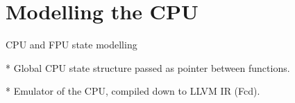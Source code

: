 
\section{Modelling the CPU}

CPU and FPU state modelling

* Global CPU state structure passed as pointer between functions.

* Emulator of the CPU, compiled down to LLVM IR (Fcd).

